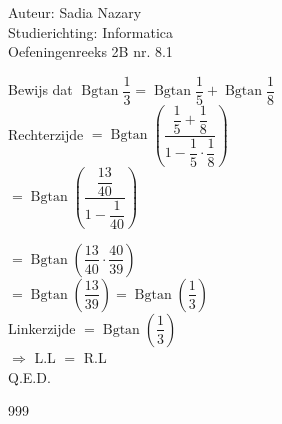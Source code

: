 \documentclass[a4paper]{article}
\begin{document}
  
\noindent \large Auteur: Sadia Nazary          \\
\noindent \large Studierichting: Informatica   \\
\noindent \large Oefeningenreeks 2B nr. 8.1    \\

\medskip

\normalsize

Bewijs dat $ \operatorname{Bgtan} \dfrac{1}{3} = \operatorname{Bgtan} \dfrac{1}{5} + \operatorname{Bgtan} \dfrac{1}{8} $\\

Rechterzijde $ = \operatorname{Bgtan}\left(\dfrac{\dfrac{1}{5} + \dfrac{1}{8}}{1 - \dfrac{1}{5} \cdot \dfrac{1}{8}}\right) $\\

$ = \operatorname{Bgtan} \left(\dfrac{\dfrac{13}{40}}{1 - \dfrac{1}{40}}\right) $\\

\medskip

$ = \operatorname{Bgtan} \left( \dfrac{13}{40} \cdot \dfrac{40}{39} \right) $\\

$ = \operatorname{Bgtan} \left( \dfrac{13}{39} \right) = \operatorname{Bgtan} \left( \dfrac{1}{3} \right) $\\

Linkerzijde $ = \operatorname{Bgtan} \left(\dfrac{1}{3}\right) $\\

$ \Rightarrow $ L.L $=$ R.L \\

Q.E.D.

\begin{thebibliography}{999}
\end{thebibliography}
\end{document}
